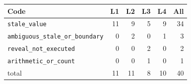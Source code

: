 \begin{tabular}{lrrrrr}
\toprule
\textbf{Code} & \textbf{L1} & \textbf{L2} & \textbf{L3} & \textbf{L4} & \textbf{All} \\
\midrule
\texttt{stale\_value} & 11 & 9 & 5 & 9 & 34 \\
\texttt{ambiguous\_stale\_or\_boundary} & 0 & 2 & 0 & 1 & 3 \\
\texttt{reveal\_not\_executed} & 0 & 0 & 2 & 0 & 2 \\
\texttt{arithmetic\_or\_count} & 0 & 0 & 1 & 0 & 1 \\
\midrule
total & 11 & 11 & 8 & 10 & 40 \\
\bottomrule
\end{tabular}
